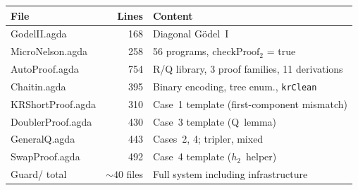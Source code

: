 \documentclass[11pt]{article}
\begin{document}
\medskip
\begin{center}
\begin{tabular}{lrl}
\textbf{File} & \textbf{Lines} & \textbf{Content} \\
\hline
GodelII.agda & 168 & Diagonal G\"odel~I \\
MicroNelson.agda & 258 & 56 programs, $\mathrm{checkProof}_2$ = true \\
AutoProof.agda & 754 & R/Q library, 3 proof families, 11 derivations \\
Chaitin.agda & 395 & Binary encoding, tree enum., \texttt{krClean} \\
KRShortProof.agda & 310 & Case~1 template (first-component mismatch) \\
DoublerProof.agda & 430 & Case~3 template (Q~lemma) \\
GeneralQ.agda & 443 & Cases~2, 4; tripler, mixed \\
SwapProof.agda & 492 & Case~4 template ($h_2$~helper) \\
\hline
Guard/ total & ${\sim}40$ files & Full system including infrastructure \\
\end{tabular}
\end{center}



\end{document}
